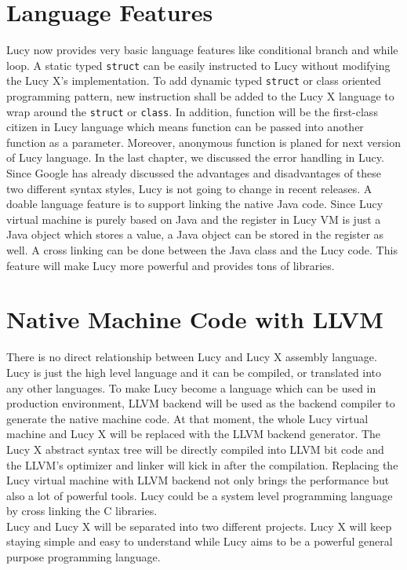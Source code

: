 \section{Language Features}
Lucy now provides very basic language features like conditional branch and while loop. A static typed \texttt{struct} can be easily instructed to Lucy without modifying the Lucy X's implementation. To add dynamic typed \texttt{struct} or class oriented programming pattern, new instruction shall be added to the Lucy X language to wrap around the \texttt{struct} or \texttt{class}. In addition, function will be the first-class citizen in Lucy language which means function can be passed into another function as a parameter. Moreover, anonymous function is planed for next version of Lucy language.
In the last chapter, we discussed the error handling in Lucy. Since Google has already discussed the advantages and disadvantages of these two different syntax styles, Lucy is not going to change in recent releases.
A doable language feature is to support linking the native Java code. Since Lucy virtual machine is purely based on Java and the register in Lucy VM is just a Java object which stores a value, a Java object can be stored in the register as well. A cross linking can be done between the Java class and the Lucy code. This feature will make Lucy more powerful and provides tons of libraries.


\section{Native Machine Code with LLVM}
There is no direct relationship between Lucy and Lucy X assembly language. Lucy is just the high level language and it can be compiled, or translated into any other languages. To make Lucy become a language which can be used in production environment, LLVM backend will be used as the backend compiler to generate the native machine code. At that moment, the whole Lucy virtual machine and Lucy X will be replaced with the LLVM backend generator. The Lucy X abstract syntax tree will be directly compiled into LLVM bit code and the LLVM's optimizer and linker will kick in after the compilation. Replacing the Lucy virtual machine with LLVM backend not only brings the performance but also a lot of powerful tools. Lucy could be a system level programming language by cross linking the C libraries. \\
Lucy and Lucy X will be separated into two different projects. Lucy X will keep staying simple and easy to understand while Lucy aims to be a powerful general purpose programming language.
